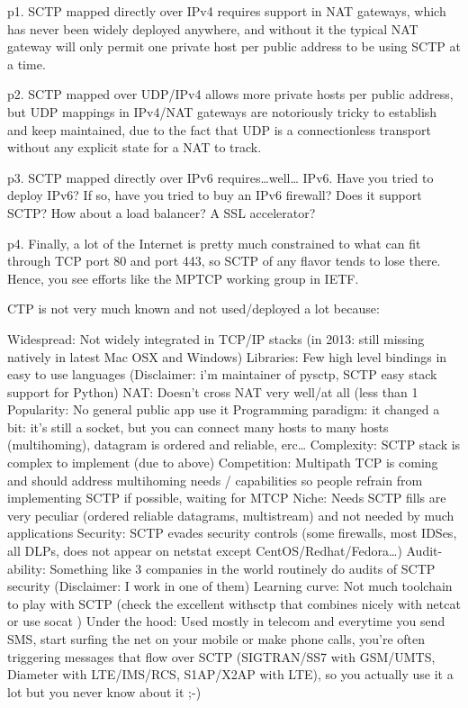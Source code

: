\documentclass[twoside]{article}
\begin{document}
 p1. SCTP mapped directly over IPv4 requires support in NAT gateways,
 which has never been widely deployed anywhere, and without it the typical
 NAT gateway will only permit one private host per public address to be
 using SCTP at a time.

 p2. SCTP mapped over UDP/IPv4 allows more private hosts per public
 address, but UDP mappings in IPv4/NAT gateways are notoriously tricky
 to establish and keep maintained, due to the fact that UDP is a
 connectionless transport without any explicit state for a NAT to track.

 p3. SCTP mapped directly over IPv6 requires\ldots well\ldots
 IPv6. Have you tried to deploy IPv6? If so, have you tried to buy
 an IPv6 firewall? Does it support SCTP? How about a load balancer? A
 SSL accelerator?

 p4. Finally, a lot of the Internet is pretty much constrained to what
 can fit through TCP port 80 and port 443, so SCTP of any flavor tends to
 lose there. Hence, you see efforts like the MPTCP working group in IETF.



 CTP is not very much known and not used/deployed a lot because:

 Widespread: Not widely integrated in TCP/IP stacks (in 2013: still missing natively in latest Mac OSX and Windows)
 Libraries: Few high level bindings in easy to use languages (Disclaimer: i'm maintainer of pysctp, SCTP easy stack support for Python)
 NAT: Doesn't cross NAT very well/at all (less than 1%
 Popularity: No general public app use it
 Programming paradigm: it changed a bit: it's still a socket, but you can connect many hosts to many hosts (multihoming), datagram is ordered and reliable, erc\ldots
 Complexity: SCTP stack is complex to implement (due to above)
 Competition: Multipath TCP is coming and should address multihoming needs / capabilities so people refrain from implementing SCTP if possible, waiting for MTCP
 Niche: Needs SCTP fills are very peculiar (ordered reliable datagrams, multistream) and not needed by much applications
 Security: SCTP evades security controls (some firewalls, most IDSes, all DLPs, does not appear on netstat except CentOS/Redhat/Fedora\ldots)
 Audit-ability: Something like 3 companies in the world routinely do audits of SCTP security (Disclaimer: I work in one of them)
 Learning curve: Not much toolchain to play with SCTP (check the excellent withsctp that combines nicely with netcat or use socat )
 Under the hood: Used mostly in telecom and everytime you send SMS, start surfing the net on your mobile or make phone calls, you're often triggering messages that flow over SCTP (SIGTRAN/SS7 with GSM/UMTS, Diameter with LTE/IMS/RCS, S1AP/X2AP with LTE), so you actually use it a lot but you never know about it ;-)
\end{document}
